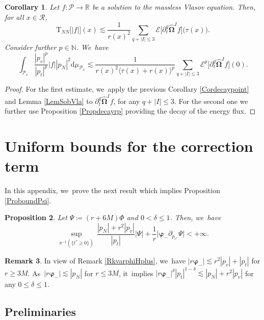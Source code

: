 \documentclass[10pt]{amsart}
\theoremstyle{plain}
\newtheorem{proposition}{Proposition}[section]
\newtheorem{corollary}[proposition]{Corollary}
\theoremstyle{definition}
\newtheorem{remark}[proposition]{Remark}
\newcommand\R{{\mathbb{R}}}
\newcommand\dr{{\mathrm{d}}}
\begin{document}
\begin{corollary}\label{Cordecay}
Let $f : \mathcal{P} \to \R$ be a solution to the massless Vlasov equation. Then, for all $x \in \mathcal{R}$,
\[
\mathrm{T}_{NN}\bigl[|f|\bigr] (x) \lesssim \frac{1}{r(x)^2} \sum_{q+|I| \leq 3} \mathcal{E}\bigl[ \partial_t^q \widehat{\mathbf{\Omega}}^I f \bigr] \bigl(\tau (x) \bigr).
\]
Consider further $p \in \mathbb{N}$. We~have
\[
\int_{\mathcal{P}_x} \frac{|p_v|^p}{|p_t|^p} |f| |p_N|^2 \dr \mu_{\mathcal{P}_x} \lesssim \frac{1}{r(x)^2 \langle \tau (x)+r(x) \rangle^p} \sum_{q+|I| \leq 3} \mathcal{E}^p\bigl[ \partial_t^q \widehat{\mathbf{\Omega}}^I f \bigr] (0).
\]
\end{corollary}
\begin{proof}
For the first estimate, we~apply the previous Corollary \ref{Cordecaypoint} and Lemma \ref{LemSobVla} to $ \partial_t^q \widehat{\mathbf{\Omega}}^I f$, for any $q+|I| \leq 3$. For the second one we further use Proposition \ref{Propdecayrp} providing the decay of the energy flux.
\end{proof}

\appendix

\section{Uniform bounds for the correction term}\label{Append}

In this appendix, we~prove the next result which implies Proposition \ref{ProboundPsi}.

\begin{proposition}\label{ProboundPsibis}
Let $\Psi \coloneqq (r+6M)\Phi$ and $0 < \delta \leq 1$. Then, we~have
\[
\sup_{ \pi^{-1} (\{t^* \geq 0 \})} \,\frac{|p_N|+r^2|p_v|}{|p_t|}|\Psi|+\frac{1}{r}\big|\pmb{\varphi}_- \partial_{p_{r^*}} \Psi \big| < +\infty.
\]
\end{proposition}
\begin{remark}\label{RkboundPsi}
In view of Remark \ref{RkvarphiHplus}, we~have $|r \pmb{\varphi}_-| \lesssim r^2|p_v|+|p_t|$ for $r \geq 3M$. As~$|r \pmb{\varphi}_-| \lesssim |p_N|$ for $r \leq 3M$, it~implies $|r \pmb{\varphi}_-|^\delta |p_t|^{1-\delta} \lesssim |p_N|+r^2|p_v|$ for any $0 \leq \delta \leq 1$.
\end{remark}

\subsection{Preliminaries}
\end{document}
